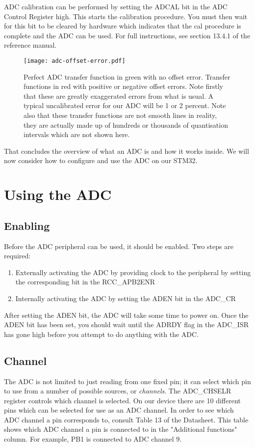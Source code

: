 ADC calibration can be performed by setting the ADCAL bit in the ADC Control Register high. This starts the calibration procedure. You must then wait for this bit to be cleared by hardware which indicates that the cal procedure is complete and the ADC can be used. For full instructions, see section 13.4.1 of the reference manual. 

\begin{figure}
  \centering
  \texttt{[image: adc-offset-error.pdf]}
  \caption{Perfect ADC transfer function in green with no offset error. Transfer functions in red with positive or negative offset errors. Note firstly that these are greatly exaggerated errors from what is usual. A typical uncalibrated error for our ADC will be 1 or 2 percent. Note also that these transfer functions are not smooth lines in reality, they are actually made up of hundreds or thousands of quantisation intervals which are not shown here.}
  \label{fig:adc-offset-error}
\end{figure}


That concludes the overview of what an ADC is and how it works inside. We will now consider how to configure and use the ADC on our STM32.

\section{Using the ADC}
\subsection{Enabling}
Before the ADC peripheral can be used, it should be enabled. Two steps are required: 
\begin{enumerate}
\item Externally activating the ADC by providing clock to the peripheral by setting the corresponding bit in the RCC\_APB2ENR
\item Internally activating the ADC by setting the ADEN bit in the ADC\_CR
\end{enumerate}

After setting the ADEN bit, the ADC will take some time to power on. Once the ADEN bit has been set, you should wait until the ADRDY flag in the ADC\_ISR has gone high before you attempt to do anything with the ADC. 

\subsection{Channel}
The ADC is not limited to just reading from one fixed pin; it can select which pin to use from a number of possible sources, or \emph{channels}.
The ADC\_CHSELR register controls which channel is selected. On our device there are 10 different pins which can be selected for use as an ADC channel. In order to see which ADC channel a pin corresponds to, consult Table 13 of the Datasheet. This table shows which ADC channel a pin is connected to in the "Additional functions" column. For example, PB1 is connected to ADC channel 9.

